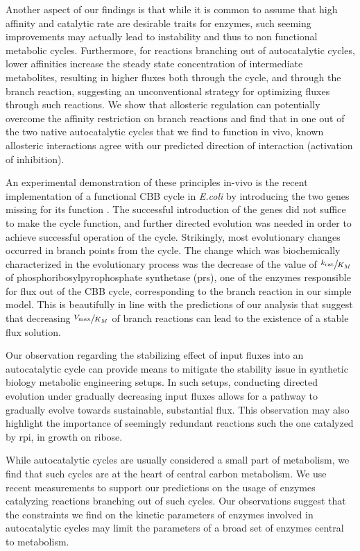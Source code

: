 Another aspect of our findings is that while it is common to assume that high affinity and catalytic rate are desirable traits for enzymes, such seeming improvements may actually lead to instability and thus to non functional metabolic cycles.
Furthermore, for reactions branching out of autocatalytic cycles, lower affinities increase the steady state concentration of intermediate metabolites, resulting in higher fluxes both through the cycle, and through the branch reaction, suggesting an unconventional strategy for optimizing fluxes through such reactions.
We show that allosteric regulation can potentially overcome the affinity restriction on branch reactions and find that in one out of the two native autocatalytic cycles that we find to function in vivo, known allosteric interactions agree with our predicted direction of interaction (activation of inhibition).

An experimental demonstration of these principles in-vivo is the recent implementation of a functional CBB cycle in \emph{E.coli} by introducing the two genes missing for its function \cite{Antonovsky2016-jy}.
The successful introduction of the genes did not suffice to make the cycle function, and further directed evolution was needed in order to achieve successful operation of the cycle.
Strikingly, most evolutionary changes occurred in branch points from the cycle.
The change which was biochemically characterized in the evolutionary process was the decrease of the value of $\sfrac{k_{\text{cat}}}{K_M}$ of phosphoribosylpyrophosphate synthetase (prs), one of the enzymes responsible for flux out of the CBB cycle, corresponding to the branch reaction in our simple model.
This is beautifully in line with the predictions of our analysis that suggest that decreasing $\sfrac{V_{\max}}{K_M}$ of branch reactions can lead to the existence of a stable flux solution.

Our observation regarding the stabilizing effect of input fluxes into an autocatalytic cycle can provide means to mitigate the stability issue in synthetic biology metabolic engineering setups.
In such setups, conducting directed evolution under gradually decreasing input fluxes allows for a pathway to gradually evolve towards sustainable, substantial flux.
This observation may also highlight the importance of seemingly redundant reactions such the one catalyzed by rpi, in growth on ribose.

While autocatalytic cycles are usually considered a small part of metabolism, we find that such cycles are at the heart of central carbon metabolism.
We use recent measurements to support our predictions on the usage of enzymes catalyzing reactions branching out of such cycles.
Our observations suggest that the constraints we find on the kinetic parameters of enzymes involved in autocatalytic cycles may limit the parameters of a broad set of enzymes central to metabolism.

